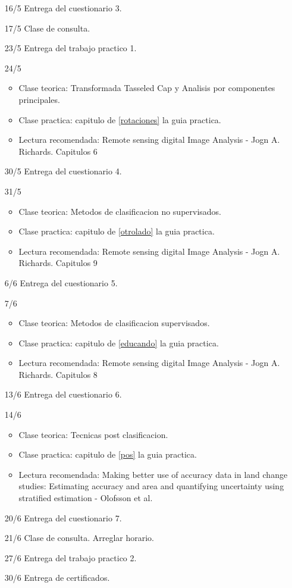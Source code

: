 \documentclass[a4paper]{book}
\begin{document}
\begin{itemize}
  \item[16/5] Entrega del cuestionario 3.
  \item[17/5] Clase de consulta.
  \item[23/5] Entrega del trabajo practico 1.
  \item[24/5] 
  \begin{itemize}
    \item Clase teorica: Transformada Tasseled Cap y Analisis por componentes principales.
    \item Clase practica: capitulo de \ref{rotaciones} la guia practica.
    \item Lectura recomendada: Remote sensing digital Image Analysis - Jogn A. Richards. Capitulos 6
  \end{itemize}
  \item[30/5] Entrega del cuestionario 4.
  \item[31/5] 
  \begin{itemize}
    \item Clase teorica: Metodos de clasificacion no supervisados.
    \item Clase practica: capitulo de \ref{otrolado} la guia practica.
    \item Lectura recomendada: Remote sensing digital Image Analysis - Jogn A. Richards. Capitulos 9
  \end{itemize}
  \item[6/6] Entrega del cuestionario 5.
  \item[7/6] 
  \begin{itemize}
    \item Clase teorica: Metodos de clasificacion supervisados.
    \item Clase practica: capitulo de \ref{educando} la guia practica.
    \item Lectura recomendada: Remote sensing digital Image Analysis - Jogn A. Richards. Capitulos 8
  \end{itemize}
  \item[13/6] Entrega del cuestionario 6.
  \item[14/6] 
  \begin{itemize}
    \item Clase teorica: Tecnicas post clasificacion.
    \item Clase practica: capitulo de \ref{pos} la guia practica.
    \item Lectura recomendada: Making better use of accuracy data in land change studies: Estimating accuracy and
area and quantifying uncertainty using stratified estimation - Olofsson et al.
  \end{itemize}
  \item[20/6] Entrega del cuestionario 7.
  \item[21/6] Clase de consulta. Arreglar horario.
  \item[27/6] Entrega del trabajo practico 2.
  \item[30/6] Entrega de certificados.
\end{itemize}
\end{document}
